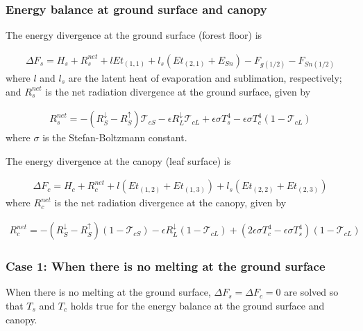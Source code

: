 \subsubsection{Energy balance at ground surface and canopy}\label{energy-balance-at-ground-surface-and-canopy}

The energy divergence at the ground surface (forest floor) is

\begin{eqnarray}
 \Delta F_s =
  H_s + R^{net}_s + l Et_{(1,1)} + l_s ( Et_{(2,1)} + E_{Sn} )
  - F_{g(1/2)} - F_{Sn(1/2)} \label{eq136}
\end{eqnarray} where \(l\) and \(l_s\) are the latent heat of evaporation and sublimation, respectively; and \(R^{net}_s\) is the net radiation divergence at the ground surface, given by

\begin{eqnarray}
  R^{net}_s = -(R^{\downarrow}_S - R^{\uparrow}_S) {\mathcal{T}}_{cS}
              - \epsilon R^{\downarrow}_L {\mathcal{T}}_{cL}
              + \epsilon \sigma T_s^4
              - \epsilon \sigma T_c^4 (1 - {\mathcal{T}}_{cL})
\end{eqnarray} where \(\sigma\) is the Stefan-Boltzmann constant.

The energy divergence at the canopy (leaf surface) is

\begin{eqnarray}
  \Delta F_c =
  H_c + R^{net}_c + l ( Et_{(1,2)} + Et_{(1,3)} )
  + l_s ( Et_{(2,2)} + Et_{(2,3)} )
\end{eqnarray} where \(R^{net}_c\) is the net radiation divergence at the canopy, given by

\begin{eqnarray}
  R^{net}_c = -(R^{\downarrow}_S - R^{\uparrow}_S) (1-{\mathcal{T}}_{cS})
              - \epsilon R^{\downarrow}_L (1-{\mathcal{T}}_{cL})
              + ( 2 \epsilon \sigma T_c^4
              - \epsilon \sigma T_s^4 ) (1 - {\mathcal{T}}_{cL}) \label{eq139}
\end{eqnarray}

\subsubsection{Case 1: When there is no melting at the ground surface}\label{case-1-when-there-is-no-melting-at-the-ground-surface}

When there is no melting at the ground surface, \(\Delta F_s=\Delta F_c=0\) are solved so that \(T_s\) and \(T_c\) holds true for the energy balance at the ground surface and canopy.

